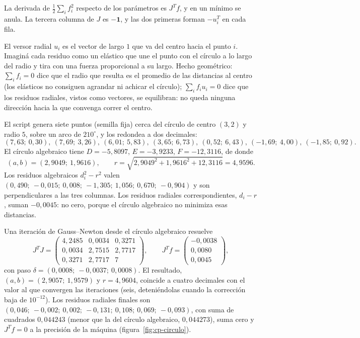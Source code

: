 \begin{demostracion}
La derivada de \(\tfrac12\sum_if_i^2\) respecto de los parámetros es \(J^Tf\), y en un mínimo
se anula. La tercera columna de \(J\) es \(-\mathbf 1\), y las dos primeras forman
\(-u_i^T\) en cada fila.
\end{demostracion}

El versor radial \(u_i\) es el vector de largo \(1\) que va del centro hacia el punto \(i\).
Imaginá cada residuo como un elástico que une el punto con el círculo a lo largo del radio y
tira con una fuerza proporcional a su largo. Hecho geométrico: \(\sum_if_i=0\) dice que el
radio que resulta es el promedio de las distancias al centro (los elásticos no consiguen agrandar
ni achicar el círculo); \(\sum_if_iu_i=0\) dice que los residuos radiales, vistos como
vectores, se equilibran: no queda ninguna dirección hacia la que convenga correr el centro.

\begin{ejemplo}\label{ej:cp-circulo}
El script genera siete puntos (semilla fija) cerca del círculo de centro \((3,2)\) y radio
\(5\), sobre un arco de \(210^\circ\), y los redondea a dos decimales:
\[
  (7{,}63;\ 0{,}30),\ (7{,}69;\ 3{,}26),\ (6{,}01;\ 5{,}83),\ (3{,}65;\ 6{,}73),\
  (0{,}52;\ 6{,}43),\ (-1{,}69;\ 4{,}00),\ (-1{,}85;\ 0{,}92).
\]
El círculo algebraico tiene \(D=-5{,}8097\), \(E=-3{,}9233\), \(F=-12{,}3116\), de donde
\[
  (a,b)=(2{,}9049;\ 1{,}9616),\qquad r=\sqrt{2{,}9049^2+1{,}9616^2+12{,}3116}=4{,}9596 .
\]
Los residuos algebraicos \(d_i^2-r^2\) valen
\((0{,}490;\ -0{,}015;\ 0{,}008;\ -1{,}305;\ 1{,}056;\ 0{,}670;\ -0{,}904)\) y son
perpendiculares a las tres columnas. Los residuos
radiales correspondientes, \(d_i-r\), suman \(-0{,}0045\): no cero, porque el círculo
algebraico no minimiza esas distancias.

Una iteración de Gauss--Newton desde el círculo algebraico resuelve
\[
  J^TJ=\begin{pmatrix}4{,}2485&0{,}0034&0{,}3271\\0{,}0034&2{,}7515&2{,}7717\\
  0{,}3271&2{,}7717&7\end{pmatrix},\qquad
  J^Tf=\begin{pmatrix}-0{,}0038\\0{,}0080\\0{,}0045\end{pmatrix},
\]
con paso \(\delta=(0{,}0008;\ -0{,}0037;\ 0{,}0008)\). El resultado,
\((a,b)=(2{,}9057;\ 1{,}9579)\) y \(r=4{,}9604\), coincide a cuatro decimales con el valor
al que convergen las iteraciones (seis, deteniéndolas cuando la corrección baja de
\(10^{-12}\)). Los residuos radiales
finales son \((0{,}046;\ -0{,}002;\ 0{,}002;\ -0{,}131;\ 0{,}108;\ 0{,}069;\ -0{,}093)\),
con suma de cuadrados \(0{,}044243\) (menor que la del círculo algebraico, \(0{,}044273\)),
suma cero y \(J^Tf=0\) a la precisión de la máquina (figura~\ref{fig:cp-circulo}).
\end{ejemplo}

